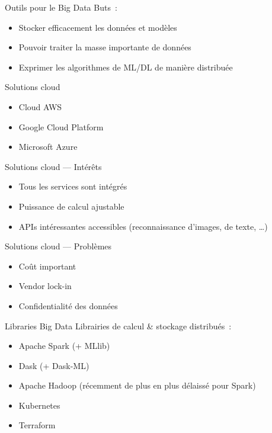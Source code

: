 \begin{frame}{Outils pour le Big Data}
  Buts~:
  \begin{itemize}[<+->]
    \item Stocker efficacement les données et modèles
    \item Pouvoir traiter la masse importante de données
    \item Exprimer les algorithmes de ML/DL de manière distribuée
  \end{itemize}
\end{frame}

\begin{frame}{Solutions cloud}
  \begin{itemize}[<+->]
    \item Cloud AWS
    \item Google Cloud Platform
    \item Microsoft Azure
  \end{itemize}
\end{frame}

\begin{frame}{Solutions cloud --- Intérêts}
  \begin{itemize}[<+->]
    \item Tous les services sont intégrés
    \item Puissance de calcul ajustable
    \item APIs intéressantes accessibles (reconnaissance d'images, de texte, …)
  \end{itemize}
\end{frame}

\begin{frame}{Solutions cloud --- Problèmes}
  \begin{itemize}[<+->]
    \item Coût important
    \item Vendor lock-in
    \item Confidentialité des données
  \end{itemize}
\end{frame}

\begin{frame}{Libraries Big Data}
  Librairies de calcul \& stockage distribués~:
  \begin{itemize}[<+->]
    \item Apache Spark (+ MLlib)
    \item Dask (+ Dask-ML)
    \item Apache Hadoop (récemment de plus en plus délaissé pour Spark)
  \end{itemize}  

  \begin{itemize}[<+->]
    \item Kubernetes
    \item Terraform
  \end{itemize}
\end{frame}